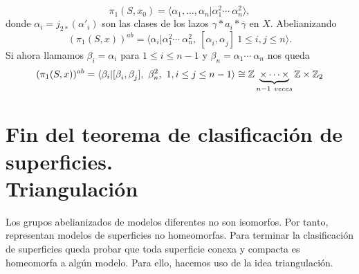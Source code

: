 \documentclass[GTSResumen.tex]{subfiles}
\begin{document}
\[
\pi_1(S,x_0)=\langle\alpha_1,\dots,\alpha_n|\alpha_1^2\cdots\ \alpha_n^2\rangle,
\]
donde $\alpha_i=j_{2*}(\alpha'_i)$ son las clases de los lazos $\gamma*a_i*\overline{\gamma}$ en $X$. Abelianizando
\[
(\pi_1(S,x))^{ab}=\langle\alpha_i|\alpha_1^2\cdots\ \alpha_n^2,\ [\alpha^{}_i,\alpha^{}_j]\ 1\leq i, j\leq n \rangle.
\]
Si ahora llamamos $\beta_i=\alpha_i$ para $1\leq i\leq n-1$ y $\beta_n=\alpha_1\cdots\ \alpha_n$ nos queda
\[
(\pi_1(S,x))^{ab}=\langle\beta_i|[\beta^{}_i,\beta^{}_j],\ \beta^2_n,\ 1, i\leq j\leq n-1\rangle\cong\Z\underbrace{\times\cdots\times}_{n-1\ veces}\Z\times\Z_2
\]
\section{Fin del teorema de clasificación de superficies.\\ Triangulación}
Los grupos abelianizados de modelos diferentes no son isomorfos. Por tanto, representan modelos de superficies no homeomorfas. Para terminar la clasificación de superficies queda probar que toda superficie conexa y compacta es homeomorfa a algún modelo. Para ello, hacemos uso de la idea triangulación.
\end{document}
